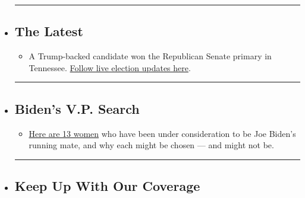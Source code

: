 \begin{itemize}
\item
  \begin{center}\rule{0.5\linewidth}{\linethickness}\end{center}

  \hypertarget{the-latest}{%
  \subsection{The Latest}\label{the-latest}}

  \begin{itemize}
  \tightlist
  \item
    A Trump-backed candidate won the Republican Senate primary in
    Tennessee.
    \href{https://www.nytimes3xbfgragh.onion/2020/08/07/us/elections/biden-vs-trump.html?action=click\&pgtype=Article\&state=default\&region=BELOW_MAIN_CONTENT\&context=storylines_guide}{Follow
    live election updates here}.
  \end{itemize}
\item
  \begin{center}\rule{0.5\linewidth}{\linethickness}\end{center}

  \hypertarget{bidens-vp-search}{%
  \subsection{Biden's V.P. Search}\label{bidens-vp-search}}

  \begin{itemize}
  \tightlist
  \item
    \href{https://www.nytimes3xbfgragh.onion/article/biden-vice-president-2020.html?action=click\&pgtype=Article\&state=default\&region=BELOW_MAIN_CONTENT\&context=storylines_guide}{Here
    are 13 women} who have been under consideration to be Joe Biden's
    running mate, and why each might be chosen --- and might not be.
  \end{itemize}
\item
  \begin{center}\rule{0.5\linewidth}{\linethickness}\end{center}

  \hypertarget{keep-up-with-our-coverage}{%
  \subsection{Keep Up With Our
  Coverage}\label{keep-up-with-our-coverage}}


\end{itemize}
